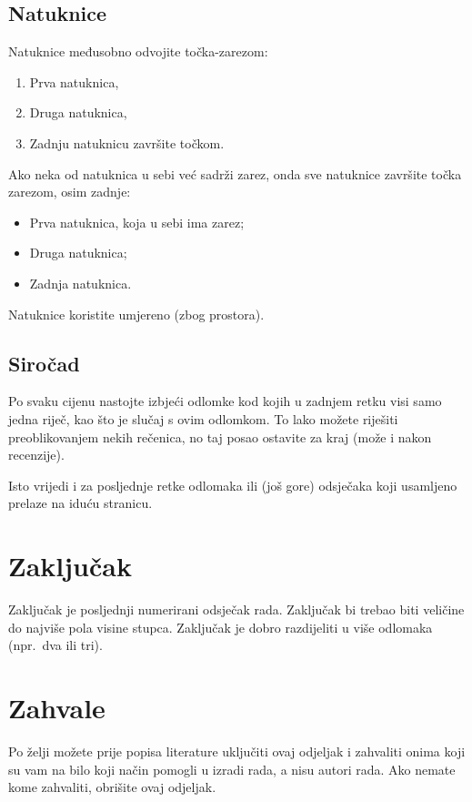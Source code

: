\documentclass[10pt, a4paper]{article}
\begin{document}
\subsection{Natuknice}

Natuknice međusobno odvojite točka-zarezom:

\begin{enumerate}
\item Prva natuknica,
\item Druga natuknica,
\item Zadnju natuknicu završite točkom.
\end{enumerate}

Ako neka od natuknica u sebi već sadrži zarez, onda sve natuknice
završite točka zarezom, osim zadnje:

\begin{itemize}
\item Prva natuknica, koja u sebi ima zarez;
\item Druga natuknica;
\item Zadnja natuknica.
\end{itemize}

Natuknice koristite umjereno (zbog prostora).

\subsection{Siročad}

Po svaku cijenu nastojte izbjeći odlomke kod kojih u zadnjem retku
visi samo jedna riječ, kao što je slučaj s ovim odlomkom. To lako
možete riješiti preoblikovanjem nekih rečenica, no taj posao ostavite
za kraj (može i nakon recenzije).

Isto vrijedi i za posljednje retke odlomaka ili (još gore) odsječaka
koji usamljeno prelaze na iduću stranicu.

\section{Zaključak}

Zaključak je posljednji numerirani odsječak rada. Zaključak bi trebao
biti veličine do najviše pola visine stupca. Zaključak je dobro
razdijeliti u više odlomaka (npr.~dva ili tri).

\section*{Zahvale}

Po želji možete prije popisa literature uključiti ovaj odjeljak i
zahvaliti onima koji su vam na bilo koji način pomogli u izradi rada,
a nisu autori rada. Ako nemate kome zahvaliti, obrišite ovaj odjeljak.


 
\end{document}
